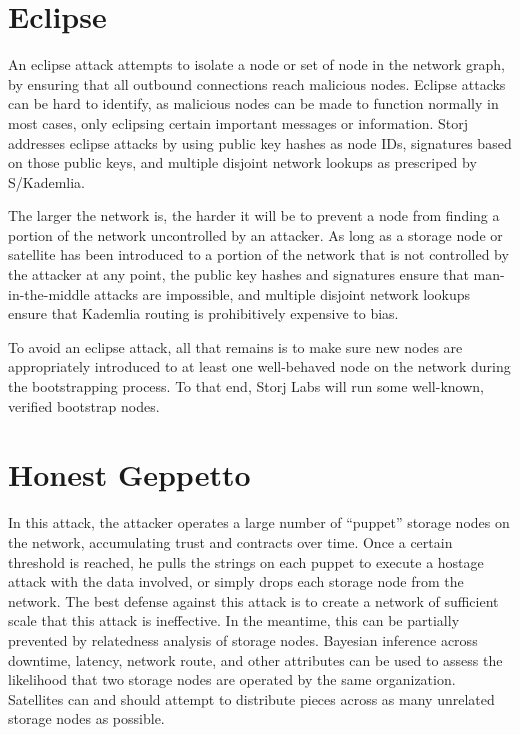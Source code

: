 \documentclass[11pt,fleqn,openany]{book}
\begin{document}
\section{Eclipse}

An eclipse attack attempts to isolate a node or set of node in the network
graph, by ensuring that all outbound connections reach malicious nodes. Eclipse
attacks can be hard to identify, as malicious nodes can be made to function
normally in most cases, only eclipsing certain important messages or
information. Storj addresses eclipse attacks by using public key hashes as node
IDs, signatures based on those public keys, and multiple disjoint network
lookups as prescriped by S/Kademlia.

The larger the network is, the harder it will
be to prevent a node from finding a portion of the network uncontrolled by
an attacker.
As long as a storage node or satellite has been introduced to a portion of
the network that is not controlled by the attacker at any point, the public
key hashes and signatures ensure that man-in-the-middle attacks are impossible,
and multiple disjoint network lookups ensure that Kademlia routing is
prohibitively expensive to bias.

To avoid an eclipse attack, all that remains
is to make sure new nodes are appropriately introduced to at least one
well-behaved node on the network during the bootstrapping process.
To that end, Storj Labs will run some well-known, verified bootstrap nodes.

\section{Honest Geppetto}

In this attack,
the attacker operates a large number of ``puppet'' storage nodes on the network,
accumulating trust and contracts over time. Once a certain threshold is reached,
he pulls the strings on each puppet to execute a hostage attack with the data
involved, or simply drops each storage node from the network. The best defense
against this attack is to create a network of sufficient scale that this attack
is ineffective. In the meantime, this can be partially prevented by relatedness
analysis of storage nodes. Bayesian inference across downtime, latency, network
route, and other
attributes can be used to assess the likelihood that two storage nodes are
operated by the same organization. Satellites can and should attempt to
distribute pieces across as many unrelated storage nodes as possible.
\end{document}
